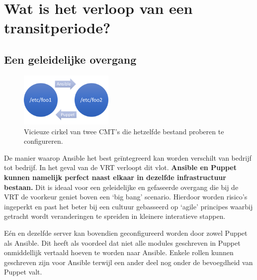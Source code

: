 \section{Wat is het verloop van een transitperiode?}
\label{sec:methodologie-verloop-transit}
\subsection{Een geleidelijke overgang}


\begin{figure}
\centering
\includegraphics[width=0.4\textwidth]{img/vicieuzecirkel.PNG}
\caption{\label{fig:vicieuzecirkel}Vicieuze cirkel van twee \gls{CMT}'s die hetzelfde bestand proberen te configureren.}
\end{figure}

De manier waarop Ansible het best ge\"integreerd kan worden verschilt van bedrijf tot bedrijf. In het geval van de \gls{VRT} verloopt dit vlot. \textbf{Ansible en Puppet kunnen namelijk perfect naast elkaar in dezelfde infrastructuur bestaan.} Dit is ideaal voor een geleidelijke en gefaseerde overgang die bij de \gls{VRT} de voorkeur geniet boven een `big bang' scenario. Hierdoor worden risico's ingeperkt en past het beter bij een cultuur gebasseerd op `agile' principes waarbij getracht wordt veranderingen te spreiden in kleinere interatieve stappen. 

E\'en en dezelfde server kan bovendien geconfigureerd worden door zowel Puppet als Ansible. Dit heeft als voordeel dat niet alle modules geschreven in Puppet onmiddellijk vertaald hoeven te worden naar Ansible. Enkele rollen kunnen geschreven zijn voor Ansible terwijl een ander deel nog onder de bevoegdheid van Puppet valt.

